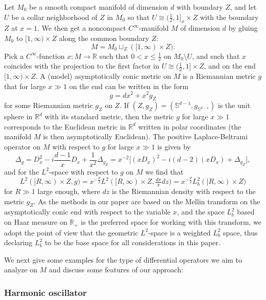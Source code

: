 \documentclass[reqno]{amsart}
\numberwithin{equation}{section}
\theoremstyle{definition}
\def\R{\mathbb R}
\begin{document}
\noindent
Let $M_0$ be a smooth compact manifold of dimension $d$ with boundary $Z$, and let $U$ be a collar neighborhood of $Z$ in $M_0$ so that $U \cong (\tfrac{1}{2},1]_x \times Z$ with the boundary $Z$ at $x=1$. We then get a noncompact $C^{\infty}$-manifold $M$ of dimension $d$ by gluing $M_0$ to $[1,\infty)\times Z$ along the common boundary $Z$:
$$
M = M_0 \sqcup_Z ([1,\infty) \times Z).
$$
Pick a $C^{\infty}$-function $x: M \to \R$ such that $0 < x \leq \frac{1}{2}$ on $M_0 \setminus U$, and such that $x$ coincides with the projection to the first factor in $U \cong (\tfrac{1}{2},1] \times Z$, and on the end $[1,\infty)\times Z$. A (model) asymptotically conic metric on $M$ is a Riemannian metric $g$ that for large $x \gg 1$ on the end can be written in the form
\begin{equation}\label{ModelMetric}
g = dx^2 + x^2g_Z
\end{equation}
for some Riemannian metric $g_Z$ on $Z$. If $(Z,g_Z) = ({\mathbb S}^{d-1},g_{{\mathbb S}^{d-1}})$ is the unit sphere in $\R^d$ with its standard metric, then the metric $g$ for large $x \gg 1$ corresponds to the Euclidean metric in $\R^d$ written in polar coordinates (the manifold $M$ is then asymptotically Euclidean). The positive Laplace-Beltrami operator on $M$ with respect to $g$ for large $x \gg 1$ is given by
$$
\Delta_g = D_x^2 - i\frac{d-1}{x}D_x + \frac{1}{x^2}\Delta_{g_Z} = x^{-2}\bigl[(xD_x)^2 - i(d-2)(xD_x) + \Delta_{g_Z} \bigr],
$$
and for the $L^2$-space with respect to $g$ on $M$ we find that
$$
L^2([R,\infty)\times Z,g) = x^{-\frac{d}{2}}L^2([R,\infty)\times Z,\tfrac{dx}{x}dz) = x^{-\frac{d}{2}}L^2_b([R,\infty)\times Z)
$$
for $R \gg 1$ large enough, where $dz$ is the Riemannian density with respect to the metric $g_Z$. As the methods in our paper are based on the Mellin transform on the asymptotically conic end with respect to the variable $x$, and the space $L^2_b$ based on Haar measure on $\R_+$ is the preferred space for working with this transform, we adopt the point of view that the geometric $L^2$-space is a weighted $L^2_b$ space, thus declaring $L^2_b$ to be the base space for all considerations in this paper.

We next give some examples for the type of differential operators we aim to analyze on $M$ and discuss some features of our approach:

\subsubsection*{Harmonic oscillator}
\end{document}
